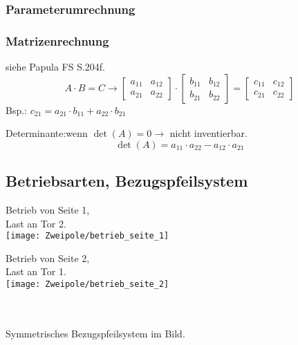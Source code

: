\subsubsection{Parameterumrechnung}
{\small
 }
\columnbreak
\subsubsection{Matrizenrechnung}
siehe Papula FS S.204f.
   \[ A\cdot B = C \rightarrow  \begin{bmatrix}
	a_{11} & a_{12}\\ 
	a_{21} & a_{22} 
\end{bmatrix}
\cdot
\begin{bmatrix}
	b_{11} & b_{12}\\ 
	b_{21} & b_{22}  
\end{bmatrix}
=
\begin{bmatrix}
	c_{11} & c_{12}\\ 
	c_{21} & c_{22}   
\end{bmatrix} \] 
Bsp.: $c_{21}=a_{21}\cdot b_{11} + a_{22} \cdot b_{21}$\\
\setlength{\parindent}{0pt}

Determinante:\quad  wenn $\det(A)=0 \rightarrow$ nicht inventierbar.
   \[ \det(A)=a_{11}\cdot a_{22} - a_{12} \cdot a_{21} \]
\subsection{Betriebsarten, Bezugspfeilsystem}
\begin{minipage}{0.5\columnwidth}
	\small
	Betrieb von Seite 1,\\ Last an Tor 2.\\
	
	\texttt{[image: Zweipole/betrieb\_seite\_1]}
\end{minipage}
\begin{minipage}{0.5\columnwidth}
	\small
	Betrieb von Seite 2,\\ Last an Tor 1.\\
	
	\texttt{[image: Zweipole/betrieb\_seite\_2]}
\end{minipage}\\
\setlength{\parindent}{0pt}\\
Symmetrisches Bezugspfeilsystem im Bild.
